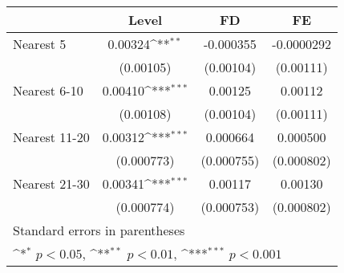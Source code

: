 {
\def\sym#1{\ifmmode^{#1}\else\(^{#1}\)\fi}
\begin{tabular}{l*{3}{c}}
\hline\hline
            &\multicolumn{1}{c}{Level}&\multicolumn{1}{c}{FD}&\multicolumn{1}{c}{FE}\\
\hline
Nearest 5   &     0.00324\sym{**} &   -0.000355         &  -0.0000292         \\
            &   (0.00105)         &   (0.00104)         &   (0.00111)         \\
[1em]
Nearest 6-10&     0.00410\sym{***}&     0.00125         &     0.00112         \\
            &   (0.00108)         &   (0.00104)         &   (0.00111)         \\
[1em]
Nearest 11-20&     0.00312\sym{***}&    0.000664         &    0.000500         \\
            &  (0.000773)         &  (0.000755)         &  (0.000802)         \\
[1em]
Nearest 21-30&     0.00341\sym{***}&     0.00117         &     0.00130         \\
            &  (0.000774)         &  (0.000753)         &  (0.000802)         \\
\hline\hline
\multicolumn{4}{l}{\footnotesize Standard errors in parentheses}\\
\multicolumn{4}{l}{\footnotesize \sym{*} \(p<0.05\), \sym{**} \(p<0.01\), \sym{***} \(p<0.001\)}\\
\end{tabular}
}
